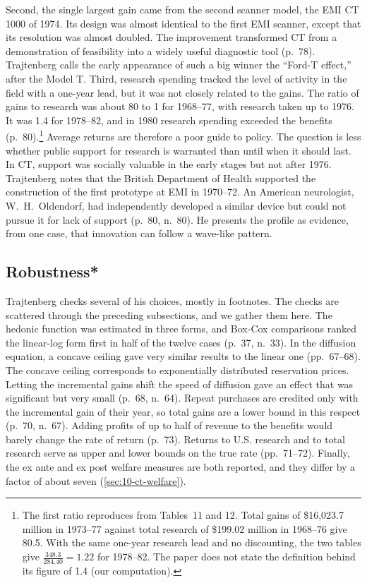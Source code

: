 Second, the single largest gain came from the second scanner model, the EMI CT 1000 of 1974. Its design was almost
identical to the first EMI scanner, except that its resolution was almost doubled. The improvement transformed CT from a
demonstration of feasibility into a widely useful diagnostic tool (p.~78). Trajtenberg calls the early appearance of
such a big winner the ``Ford-T effect,'' after the Model T. Third, research spending tracked the level of activity in
the field with a one-year lead, but it was not closely related to the gains. The ratio of gains to research was about 80
to 1 for 1968--77, with research taken up to 1976. It was 1.4 for 1978--82, and in 1980 research spending exceeded the
benefits (p.~80).\footnote{The first ratio reproduces from Tables~11 and 12. Total gains of \$16,023.7 million in
1973--77 against total research of \$199.02 million in 1968--76 give 80.5. With the same one-year research lead and
no discounting, the two tables give $\frac{348.3}{284.40} = 1.22$ for 1978--82. The paper does not state the
definition behind its figure of 1.4 (our computation).}
Average returns are therefore a poor guide to policy. The question is less whether public support for research is
warranted than until when it should last. In CT, support was socially valuable in the early stages but not after 1976.
Trajtenberg notes that the British Department of Health supported the construction of the first prototype at EMI in
1970--72. An American neurologist, W.~H.~Oldendorf, had independently developed a similar device but could not pursue
it for lack of support (p.~80, n.~80). He presents the profile as evidence, from one case, that innovation can follow a
wave-like pattern.

\subsection{Robustness*}\label{sec:10-ct-robustness}

Trajtenberg checks several of his choices, mostly in footnotes. The checks are scattered through the preceding
subsections, and we gather them here. The hedonic function was estimated in three forms, and Box-Cox comparisons
ranked the linear-log form first in half of the twelve cases (p.~37, n.~33). In the diffusion equation, a concave
ceiling gave very similar results to the linear one (pp.~67--68). The concave ceiling corresponds to exponentially
distributed reservation prices. Letting the incremental gains shift the speed of diffusion gave an effect that was
significant but very small (p.~68, n.~64). Repeat purchases are credited only with the incremental gain of their
year, so total gains are a lower bound in this respect (p.~70, n.~67). Adding profits of up to half of revenue to
the benefits would barely change the rate of return (p.~73). Returns to U.S. research and to total research serve
as upper and lower bounds on the true rate (pp.~71--72). Finally, the ex ante and ex post welfare measures are both
reported, and they differ by a factor of about seven (\cref{sec:10-ct-welfare}).

